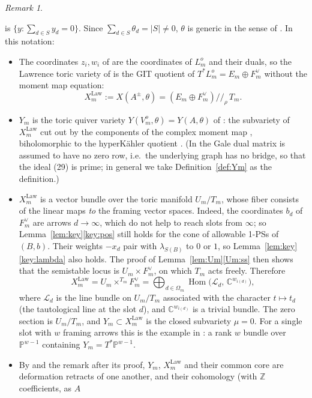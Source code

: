 \documentclass[11pt]{amsart}
\theoremstyle{definition}
\theoremstyle{remark}
\newtheorem{remark}[theorem]{Remark}
\numberwithin{equation}{section}
\newcommand{\C}{\mathbb{C}}
\newcommand{\Z}{\mathbb{Z}}
\newcommand{\Om}{\Omega_m}
\begin{document}
\begin{remark}
\begin{enumerate}[label=(\roman*),leftmargin=2em]
is $\{y:\sum_{d\in S}y_d=0\}$. Since $\sum_{d\in S}\theta_d=|S|\neq0$, $\theta$ is generic in the sense of
\cite[\S4]{HS}. In this notation:
\begin{itemize}[leftmargin=1.5em]
\item The coordinates $z_i,w_i$ of \cite[\S4]{HS} are the coordinates of $L^o_m$ and their duals, so the
Lawrence toric variety of \cite[Definition~4.1, Theorem~1.1(2)]{HS} is the GIT quotient of
$T^*L^o_m=E_m\oplus F_m^\vee$ without the moment map equation:
\[
  X^{\mathrm{Law}}_m:=X(A^\pm,\theta)=(E_m\oplus F_m^\vee)/\!/_\rho\,T_m .
\]
\item $Y_m$ is the toric quiver variety $Y(V^o_m,\theta)=Y(A,\theta)$ of \cite[\S8]{HS}: the subvariety of
$X^{\mathrm{Law}}_m$ cut out by the components of the complex moment map \cite[(29),
Definition~6.1]{HS}, biholomorphic to the hyperK\"ahler quotient \cite[Theorem~6.3]{HS}. (In
\cite[\S6]{HS} the Gale dual matrix is assumed to have no zero row, i.e.\ the underlying graph has no
bridge, so that the ideal (29) is prime; in general we take Definition~\ref{def:Ym} as the definition.)
\item $X^{\mathrm{Law}}_m$ is a vector bundle over the toric manifold $U_m/T_m$, whose fiber consists of
the linear maps \emph{to} the framing vector spaces. Indeed, the coordinates $b_d$ of $F_m^\vee$ are arrows
$d\to\infty$, which do not help to reach slots from $\infty$; so Lemma~\ref{lem:key}\ref{key:pos} still
holds for the cone of allowable 1-PSs of $(B,b)$. Their weights $-x_d$ pair with $\lambda_{S(B)}$ to
$0$ or $1$, so Lemma~\ref{lem:key}\ref{key:lambda} also holds. The proof of
Lemma~\ref{lem:Um}\ref{Um:ss} then shows that the semistable locus is $U_m\times F_m^\vee$, on which $T_m$
acts freely. Therefore
\[
  X^{\mathrm{Law}}_m=U_m\times^{T_m}F_m^\vee=\bigoplus_{d\in\Om}\operatorname{Hom}\big(\mathcal L_d,\,\C^{w_{i(d)}}\big),
\]
where $\mathcal L_d$ is the line bundle on $U_m/T_m$ associated with the character $t\mapsto t_d$ (the
tautological line at the slot $d$), and $\C^{w_{i(d)}}$ is a trivial bundle. The zero section is
$U_m/T_m$, and $Y_m\subset X^{\mathrm{Law}}_m$ is the closed subvariety $\mu=0$. For a single slot with $w$
framing arrows this is the example in \cite[\S1]{HS}: a rank $w$ bundle over $\mathbb P^{w-1}$ containing
$Y_m=T^*\mathbb P^{w-1}$.
\item By \cite[Theorem~1.1]{HS} and the remark after its proof, $Y_m$, $X^{\mathrm{Law}}_m$ and their
common core are deformation retracts of one another, and their cohomology (with $\Z$ coefficients, as $A$

\end{itemize}
\end{enumerate}
\end{remark}
\end{document}
